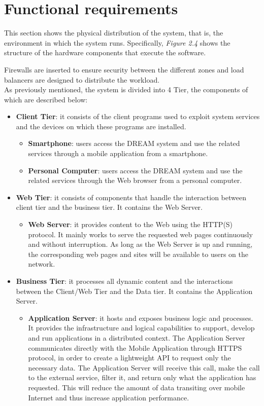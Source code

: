 \section{Functional requirements}
This section shows the physical distribution of the system, that is, the environment in which the system runs. Specifically, \textit{Figure 2.4} shows the structure of the hardware components that execute the software.

Firewalls are inserted to ensure security between the different zones and load balancers are designed to distribute the workload.\\

As previously mentioned, the system is divided into 4 Tier, the components of which are described below:
\begin{itemize}
    \item \textbf{Client Tier}: it consists of the client programs used to exploit system services and the devices on which these programs are installed.
    \begin{itemize}
        \item \textbf{Smartphone}: users access the DREAM system and use the related services through a mobile application from a smartphone.
        \item \textbf{Personal Computer}: users access the DREAM system and use the related services through the Web browser from a personal computer.
    \end{itemize}
    \item \textbf{Web Tier}: it consists of components that handle the interaction between client tier and the business tier.  It contains the Web Server.
    \begin{itemize}
        \item \textbf{Web Server}: it provides content to the Web using the HTTP(S) protocol. It mainly works to serve the requested web pages continuously and without interruption. As long as the Web Server is up and running, the corresponding web pages and sites will be available to users on the network.
    \end{itemize}
    \item \textbf{Business Tier}: it processes all dynamic content and the interactions between the Client/Web Tier and the Data tier. It contains the Application Server.
    \begin{itemize}
        \item \textbf{Application Server}: it hosts and exposes business logic and processes. It provides the infrastructure and logical capabilities to support, develop and run applications in a distributed context. The Application Server communicates directly with the Mobile Application through HTTPS protocol, in order to create a lightweight API to request only the necessary data. The Application Server will receive this call, make the call to the external service, filter it, and return only what the application has requested.  This will reduce the amount of data transiting over mobile Internet and thus increase application performance.

\end{itemize}
\end{itemize}
